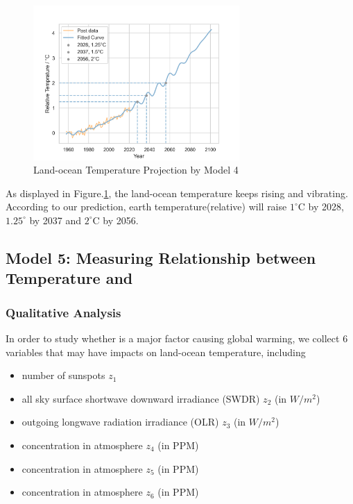 \documentclass[12pt]{article}
\begin{document}
\begin{figure}[hbt]
    \centering
    \includegraphics[width = 0.7\textwidth]{fig/2a_prediction.png}
    \caption{Land-ocean Temperature Projection by Model 4}
    \label{2a:fig}
\end{figure}

As displayed in Figure.\ref{2a:fig}, the land-ocean temperature keeps rising and vibrating. According to our prediction, earth temperature(relative) will raise $1^{\circ}$C by 2028, $1.25^\circ$ by 2037 and $2^\circ$C by 2056. 

\subsection{Model 5: Measuring Relationship between Temperature and }

\subsubsection{Qualitative Analysis}

In order to study whether  is a major factor causing global warming, we collect 6 variables that may have impacts on land-ocean temperature, including

\begin{itemize}
    \item number of sunspots $z_1$
    \item all sky surface shortwave downward irradiance (SWDR) $z_2$ (in $W / m^2$)
    \item outgoing longwave radiation irradiance (OLR) $z_3$ (in $W / m^2$)
    \item {} concentration in atmosphere $z_4$ (in PPM)
    \item {} concentration in atmosphere $z_5$ (in PPM)
    \item {} concentration in atmosphere $z_6$ (in PPM)
\end{itemize}
\end{document}
